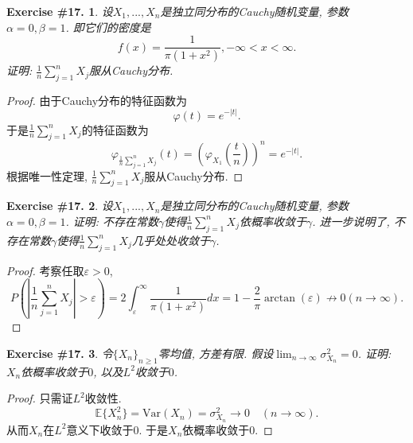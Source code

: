 \documentclass[UTF8, a4paper]{article}
\newtheorem{exercise}{Exercise \#17.}
\begin{document}
\begin{framed}
\begin{exercise}
设\(X_1, ..., X_n\)是独立同分布的Cauchy随机变量, 参数\(\alpha = 0, \beta = 1\).
即它们的密度是
$$
f(x) = \frac{1}{\pi(1+x^2)}, -\infty < x < \infty.
$$
证明: \(\frac{1}{n}\sum_{j=1}^{n}X_j\)服从Cauchy分布.
\end{exercise}
\end{framed}

\begin{proof}
由于Cauchy分布的特征函数为
$$
\varphi(t) = e^{-|t|}.
$$
于是\(\frac{1}{n} \sum_{j=1}^{n}X_j\)的特征函数为 
$$
\varphi_{\frac{1}{n}\sum_{j=1}^{n}X_j}(t) = \left(\varphi_{X_1}\left(\frac{t}{n}\right)\right)^n = e^{-|t|}.
$$
根据唯一性定理, \(\frac{1}{n}\sum_{j=1}^{n}X_j\)服从Cauchy分布.
\end{proof}



\begin{framed}
\begin{exercise}
    设\(X_1, ..., X_n\)是独立同分布的Cauchy随机变量, 参数\(\alpha = 0, \beta = 1\).
证明: 不存在常数\(\gamma\)使得\(\frac{1}{n}\sum_{j=1}^{n}X_j\)依概率收敛于\(\gamma\).
进一步说明了, 不存在常数\(\gamma\)使得\(\frac{1}{n}\sum_{j=1}^{n}X_j\)几乎处处收敛于\(\gamma\).
\end{exercise}
\end{framed}

\begin{proof}
考察任取\(\varepsilon > 0\), 
$$
P \left(\left|\frac{1}{n} \sum_{j = 1}^{n}X_j\right| > \varepsilon\right) = 2\int_{\varepsilon}^{\infty} \frac{1}{\pi(1+x^2)}dx = 1 -  \frac{2}{\pi} \arctan(\varepsilon) \not\to 0 (n\to\infty).
$$
\end{proof}



\begin{framed}
\begin{exercise}
令\(\{X_n\}_{n\geq 1}\)零均值, 方差有限. 
假设\(\lim_{n\to \infty} \sigma_{X_n}^2 = 0\).
证明: \(X_n\)依概率收敛于\(0\), 以及\(L^2\)收敛于\(0\).
\end{exercise}
\end{framed}

\begin{proof}
只需证\(L^2\)收敛性.
$$
\mathbb{E}\{X_n^2\} = \text{Var}(X_n) = \sigma_{X_n}^2 \to 0 \quad (n\to \infty).
$$
从而\(X_n\)在\(L^2\)意义下收敛于\(0\). 
于是\(X_n\)依概率收敛于\(0\).
\end{proof}
\end{document}
